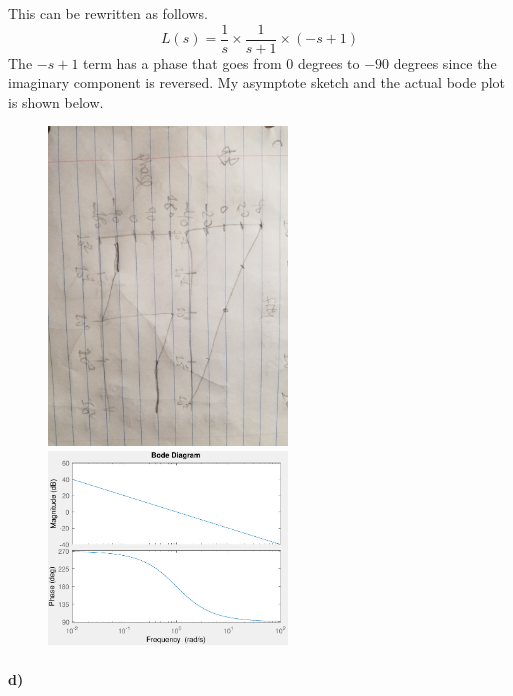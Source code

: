 \documentclass[12pt]{article}
\begin{document}
This can be rewritten as follows.
\[L(s)=\frac{1}{s}\times\frac{1}{s+1}\times(-s+1)\]
The \(-s+1\) term has a phase that goes from 0 degrees to \(-90\) degrees since the imaginary component is reversed.
My asymptote sketch and the actual bode plot is shown below.
\begin{figure}[H]
    \begin{center}
        \includegraphics[width=2.5in]{problem1c.jpg}
        \includegraphics[width=2.5in]{problem1c.pdf}
    \end{center}
\end{figure}

\paragraph{d)}
\end{document}
